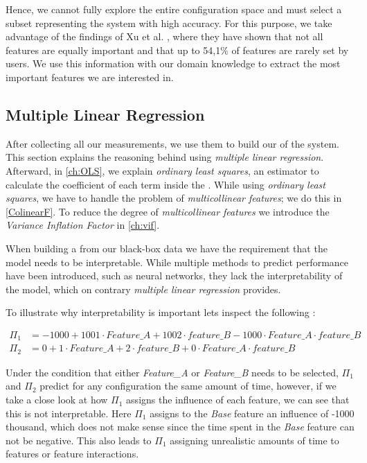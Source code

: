 Hence, we cannot fully explore the entire configuration space and must select a subset representing the system with high accuracy. 
For this purpose, we take advantage of the findings of Xu et al. \cite{TooManyKnobs}, 
where they have shown that not all features are equally important and that up to 54,1\% of features are rarely set by users. 
We use this information with our domain knowledge to extract the most important features we are interested in.


\subsection{Multiple Linear Regression} \label{ch:linear-regression}
After collecting all our measurements, we use them to build our {\perfInfluenceModel} of the system. 
This section explains the reasoning behind using \emph{multiple linear regression}. 
Afterward, in \autoref{ch:OLS}, we explain \emph{ordinary least squares}, an estimator to calculate the coefficient of each term inside the \perfInfluenceModel. 
While using \emph{ordinary least squares}, we have to handle the problem of \emph{multicollinear features}; we do this in \autoref{ColinearF}. 
To reduce the degree of \emph{multicollinear features} we introduce the \emph{Variance Inflation Factor} in \autoref{ch:vif}.

When building a \perfInfluenceModel from our black-box data we have the requirement that the model needs to be interpretable. While multiple 
methods to predict performance have been introduced, such as neural networks, they lack the interpretability of the model, which on contrary
\emph{multiple linear regression} provides.

To illustrate why interpretability is important lets inspect the following \perfInfluenceModel:

\begin{align*}
    \Pi_1 &= -1000 + 1001 \cdot \textit{Feature\_A} + 1002 \cdot \textit{feature\_B} - 1000 \cdot \textit{Feature\_A} \cdot \textit{feature\_B} \\
    \Pi_2 &= 0 + 1 \cdot \textit{Feature\_A} + 2 \cdot \textit{feature\_B} + 0 \cdot \textit{Feature\_A} \cdot \textit{feature\_B}
\end{align*}

Under the condition that either \textit{Feature\_A} or \textit{Feature\_B} needs to be selected, 
$\Pi_1$ and $\Pi_2$ predict for any configuration the same amount of time, however, 
if we take a close look at how $\Pi_1$ assigns the influence of each feature, we can see that this is not interpretable. 
Here $\Pi_1$ assigns to the \textit{Base} feature an influence of -1000 thousand, 
which does not make sense since the time spent in the \textit{Base} feature can not be negative. 
This also leads to $\Pi_1$ assigning unrealistic amounts of time to features or feature interactions. 

